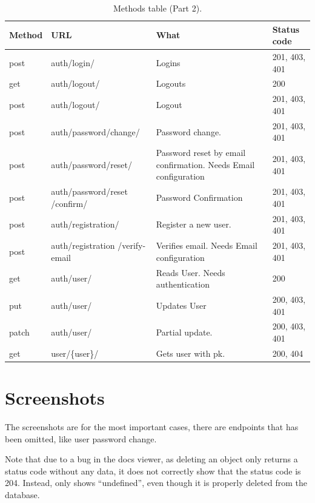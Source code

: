 \documentclass[11pt]{article}
\begin{document}
\begin{table}
	\caption{Methods table (Part 2).}
\begin{tabular}{lp{4cm}p{5.5cm}l}
	\hline
	Method & URL & What & Status code\\
	\hline
post & auth/login/ & Logins & 201, 403, 401\\
get & auth/logout/ & Logouts & 200\\
post & auth/logout/ & Logout & 201, 403, 401\\
post & auth/password/change/ & Password change. & 201, 403, 401\\
post & auth/password/reset/ & Password reset by email confirmation. Needs Email configuration & 201, 403, 401\\
post & auth/password/reset /confirm/ & Password Confirmation & 201, 403, 401\\
post & auth/registration/ & Register a new user. & 201, 403, 401\\
post & auth/registration /verify-email & Verifies email. Needs Email configuration & 201, 403, 401\\
get & auth/user/ & Reads User. Needs authentication & 200\\
put & auth/user/ & Updates User & 200, 403, 401\\
patch & auth/user/ & Partial update. & 200, 403, 401\\
\hline
get & user/\{user\}/ & Gets user with pk. & 200, 404\\
\hline
\end{tabular}
\end{table}


\newpage
\section{Screenshots}
\label{sec:org3f54c26}
The screenshots are for the most important cases, there are endpoints
that has been omitted, like user password change.

Note that due to a bug in the docs viewer, as deleting an object only
returns a status code without any data, it does not correctly show that
the status code is 204. Instead, only shows ``undefined'', even though it
is properly deleted from the database.
\end{document}
